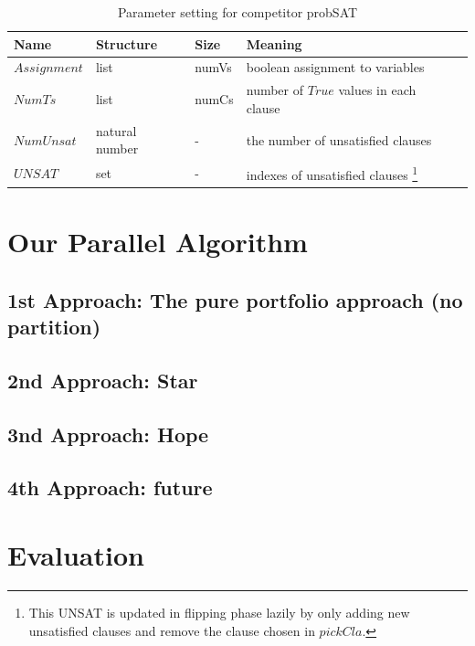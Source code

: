 \documentclass[12pt,a4paper,twoside]{scrartcl}
\numberwithin{equation}{section}
\begin{document}
\begin{table}[h!]
\begin{center}
    \begin{tabular}{|l|l|l|l|p{1cm}|}
\hline 
 	Name &Structure & Size & Meaning\\ \hline
    $Assignment$&list & numVs & boolean assignment to variables\\ \hline
	$NumTs$&list & numCs& number of $True$ values in each clause \\ \hline
	$NumUnsat$& natural number & -&the number of unsatisfied clauses  \\ \hline
	$UNSAT$& set & - & indexes of unsatisfied clauses \footnote{This UNSAT is updated in flipping phase lazily by only adding new unsatisfied clauses and remove the clause chosen in $pickCla$.}\\ \hline

	
\end{tabular}
\caption[probSAT]{Parameter setting for competitor probSAT}
\end{center}
\end{table} 

\section{Our Parallel Algorithm}
\label{sec:parallel}
\label{sec:Our parallel Algorithm}
\subsection{1st Approach: The pure portfolio approach (no partition)}
\subsection{2nd Approach: Star}
\subsection{3nd Approach: Hope}
\subsection{4th Approach: future}
\section{Evaluation} 
\label{sec:eva}
\end{document}
